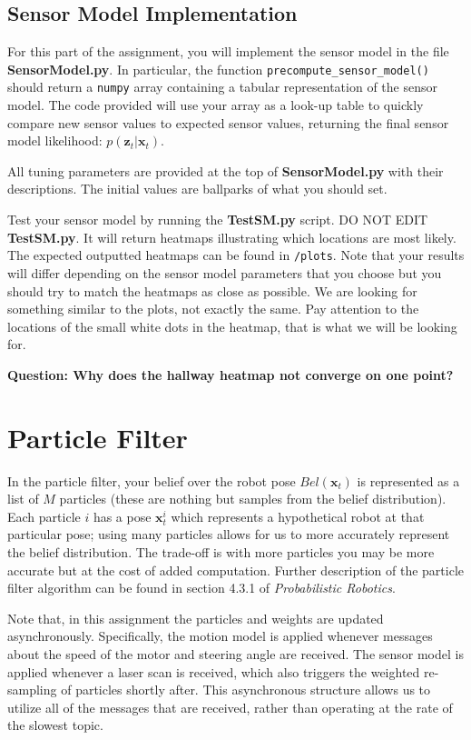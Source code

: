 \documentclass[final]{article}
\newcommand{\code}[1]{\texttt{#1}}
\begin{document}
\subsection{Sensor Model Implementation}
For this part of the assignment, you will implement the sensor model in the file \textbf{SensorModel.py}. In particular, the function \code{precompute\_sensor\_model()} should return a \code{numpy} array containing a tabular representation of the sensor model. The code provided will use your array as a look-up table to quickly compare new sensor values to expected sensor values, returning the final sensor model likelihood: $p(\mathbf{z}_t | \mathbf{x}_t)$.

All tuning parameters are provided at the top of \textbf{SensorModel.py} with their descriptions. The initial values are ballparks of what you should set.

Test your sensor model by running the \textbf{TestSM.py} script. DO NOT EDIT \textbf{TestSM.py}. It will return heatmaps illustrating which locations are most likely. The expected outputted heatmaps can be found in \code{/plots}. Note that your results will differ depending on the sensor model parameters that you choose but you should try to match the heatmaps as close as possible. We are looking for something similar to the plots, not exactly the same. Pay attention to the locations of the small white dots in the heatmap, that is what we will be looking for.

\textbf{Question: Why does the hallway heatmap not converge on one point?}

\section{Particle Filter}
 In the particle filter, your belief over the robot pose $Bel(\mathbf{x}_t)$ is represented as a list of $M$ particles (these are nothing but samples from the belief distribution). Each particle $i$ has a pose $\mathbf{x}^i_t$ which represents a hypothetical robot at that particular pose; using many particles allows for us to more accurately represent the belief distribution. The trade-off is with more particles you may be more accurate but at the cost of added computation. Further description of the particle filter algorithm can be found in section 4.3.1 of \textit{Probabilistic Robotics}. 

Note that, in this assignment the particles and weights are updated asynchronously. Specifically, the motion model is applied whenever messages about the speed of the motor and steering angle are received. The sensor model is applied whenever a laser scan is received, which also triggers the weighted re-sampling of particles shortly after. This asynchronous structure allows us to utilize all of the messages that are received, rather than operating at the rate of the slowest topic.
\end{document}
